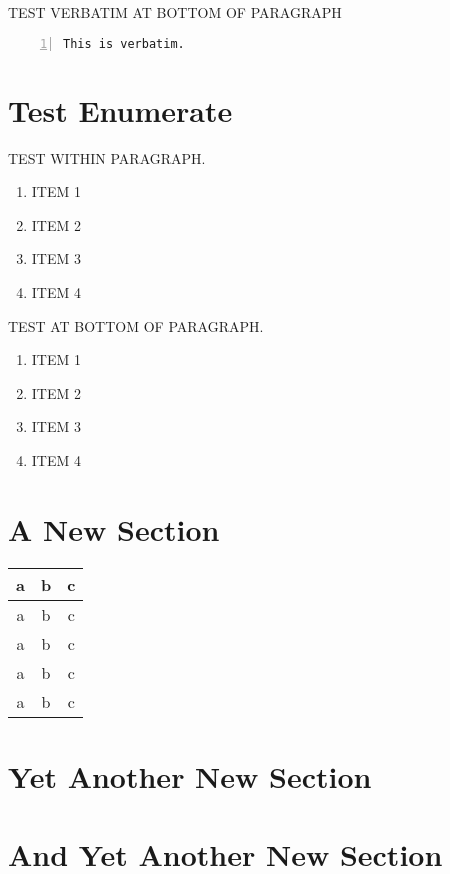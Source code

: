 TEST VERBATIM AT BOTTOM OF PARAGRAPH
\lipsum[1]
\begin{Verbatim}[frame=single, numbers=left]
This is verbatim.
\end{Verbatim}

\section{Test Enumerate}
TEST WITHIN PARAGRAPH.
\lipsum[1]
\begin{enumerate}
\item ITEM 1
\item ITEM 2
\item ITEM 3
\item ITEM 4
\end{enumerate}
\lipsum[2]


TEST AT BOTTOM OF PARAGRAPH.
\lipsum[1]
\begin{enumerate}
\item ITEM 1
\item ITEM 2
\item ITEM 3
\item ITEM 4
\end{enumerate}

\lipsum[1]

\lipsum[1]


\section{A New Section}
\lipsum[1-2]
\begin{samepage}
\begin{longtable}{|c|c|c|} \hline
a & b & c \\ \hline
a & b & c \\
a & b & c \\
a & b & c \\
a & b & c \\ \hline
\end{longtable}
\end{samepage}

\section{Yet Another New Section}
\lipsum[3-4]

\section{And Yet Another New Section}
\lipsum[3-4]

